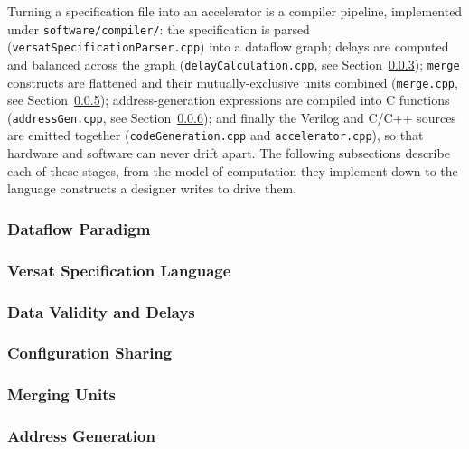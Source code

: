 \documentclass{ug}
\begin{document}
Turning a specification file into an accelerator is a compiler pipeline,
implemented under \texttt{software/compiler/}: the specification is parsed
(\texttt{versatSpecificationParser.cpp}) into a dataflow graph; delays are
computed and balanced across the graph (\texttt{delayCalculation.cpp}, see
Section~\ref{sec:data_validity}); \texttt{merge} constructs are flattened
and their mutually-exclusive units combined (\texttt{merge.cpp}, see
Section~\ref{sec:merging_units}); address-generation expressions are
compiled into C functions (\texttt{addressGen.cpp}, see
Section~\ref{sec:address_gen}); and finally the Verilog and C/C++ sources
are emitted together (\texttt{codeGeneration.cpp} and
\texttt{accelerator.cpp}), so that hardware and software can never drift
apart. The following subsections describe each of these stages, from the
model of computation they implement down to the language constructs a
designer writes to drive them.

\subsubsection{Dataflow Paradigm}
\label{sec:dataflow}


\subsubsection{Versat Specification Language}
\label{sec:versat_spec}


\subsubsection{Data Validity and Delays}
\label{sec:data_validity}


\subsubsection{Configuration Sharing}
\label{sec:config_sharing}


\subsubsection{Merging Units}
\label{sec:merging_units}


\subsubsection{Address Generation}
\label{sec:address_gen}

\end{document}

